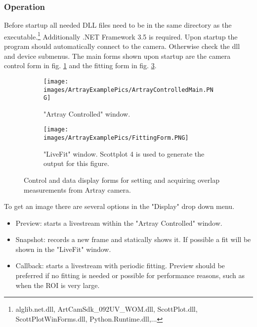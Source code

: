 \documentclass[twoside,openright,listof=numbered]{scrreprt}
\begin{document}
\subsubsection{Operation}
Before startup all needed DLL files need to be in the same directory as the executable.\footnote{alglib.net.dll, ArtCamSdk\_092UV\_WOM.dll, ScottPlot.dll, ScottPlotWinForms.dll, Python.Runtime.dll,...} Additionally .NET Framework 3.5 is required. Upon startup the program should automatically connect to the camera. Otherwise check the dll and device submenus.
The main forms shown upon startup are the camera control form in fig. \ref{fig:ArtrayMain} and the fitting form in fig. \ref{fig:ArtrayFitting}.

\begin{figure}[hbtp]
\centering
\begin{subfigure}[t]{0.49\linewidth}
\texttt{[image: images/ArtrayExamplePics/ArtrayControlledMain.PNG]}
\caption{"Artray Controlled" window.\label{fig:ArtrayMain}}
\end{subfigure}
\hfill
\begin{subfigure}[t]{0.49\linewidth}
\centering
\texttt{[image: images/ArtrayExamplePics/FittingForm.PNG]}
\caption{"LiveFit" window. Scottplot 4\cite{ScottPlot4} is used to generate the output for this figure.\label{fig:ArtrayFitting}}
\end{subfigure}
\caption{Control and data display forms for setting and acquiring overlap measurements from Artray camera.}
\end{figure}


To get an image there are several options in the "Display" drop down menu.
\begin{itemize}
\item Preview: starts a livestream within the "Artray Controlled" window.
\item Snapshot: records a new frame and statically shows it. If possible a fit will be shown in the "LiveFit" window.
\item Callback: starts a livestream with periodic fitting. Preview should be preferred if no fitting is needed or possible for performance reasons, such as when the ROI is very large.
\end{itemize}
\end{document}
